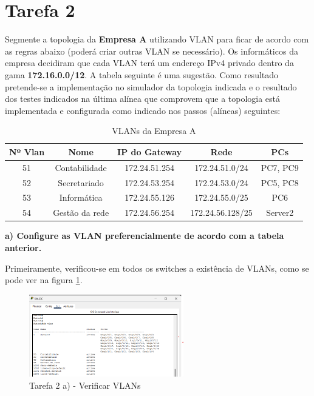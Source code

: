 \documentclass[11pt,english, openright, oneside]{book}
\begin{document}
\pagebreak



\section{Tarefa 2}

Segmente a topologia da \textbf{Empresa A} utilizando VLAN para ficar de acordo
com as regras abaixo (poderá criar outras VLAN se necessário). Os informáticos
da empresa decidiram que cada VLAN terá um endereço IPv4 privado dentro da gama
\textbf{172.16.0.0/12}. A tabela seguinte é uma sugestão. Como resultado
pretende-se a implementação no  simulador da topologia indicada e o resultado
dos testes indicados na última alínea que comprovem que a topologia está
implementada e configurada como indicado nos passos (alíneas) seguintes:  

\begin{table}[h!]
\centering
\begin{tabular}{|c|c|c|c|c|}
\hline
\textbf{Nº Vlan} & \textbf{Nome} & \textbf{IP do Gateway} & \textbf{Rede} &  \textbf{PCs}\\
\hline
51 & Contabilidade & 172.24.51.254 & 172.24.51.0/24 & PC7, PC9\\
52 & Secretariado & 172.24.53.254 & 172.24.53.0/24 & PC5, PC8\\
53 & Informática & 172.24.55.126 & 172.24.55.0/25 & PC6\\
54 & Gestão da rede & 172.24.56.254 & 172.24.56.128/25 & Server2\\
\hline
\end{tabular}
\caption{VLANs da Empresa A}
\label{tab:vlansA}
\end{table}
\vspace{0.8cm}

\textbf{a) Configure as VLAN preferencialmente de acordo com a tabela anterior.}
\vspace{0.2cm}

Primeiramente, verificou-se em todos os switches a existência de VLANs, como se pode ver na figura \ref{fig:2a1}. 

\begin{figure}[H]
    \centering
    \includegraphics[width=0.6\textwidth]{imagens/Tarefa2/2.a.1.png}
    \caption{Tarefa 2 a) - Verificar VLANs}
    \label{fig:2a1}
\end{figure}
\end{document}

